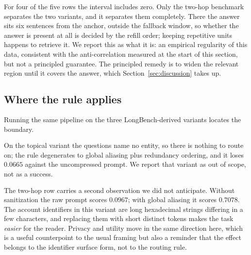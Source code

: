 For four of the five rows the interval includes zero. Only the two-hop benchmark separates
the two variants, and it separates them completely. There the answer sits six sentences from
the anchor, outside the fallback window, so whether the answer is present at all is decided
by the refill order; keeping repetitive units happens to retrieve it. We report this as what
it is: an empirical regularity of this data, consistent with the anti-correlation measured at
the start of this section, but not a principled guarantee. The principled remedy is to widen
the relevant region until it covers the answer, which Section~\ref{sec:discussion} takes up.

\subsection{Where the rule applies}

Running the same pipeline on the three LongBench-derived variants locates the boundary.

\begin{center}\small
\setlength{\tabcolsep}{4pt}
\end{center}

On the topical variant the questions name no entity, so there is nothing to route on; the
rule degenerates to global aliasing plus redundancy ordering, and it loses $0.0665$ against
the uncompressed prompt. We report that variant as out of scope, not as a success.

The two-hop row carries a second observation we did not anticipate. Without sanitization the
raw prompt scores $0.0967$; with global aliasing it scores $0.7078$. The account identifiers
in this variant are long hexadecimal strings differing in a few characters, and replacing
them with short distinct tokens makes the task \emph{easier} for the reader. Privacy and
utility move in the same direction here, which is a useful counterpoint to the usual framing
but also a reminder that the effect belongs to the identifier surface form, not to the
routing rule.
